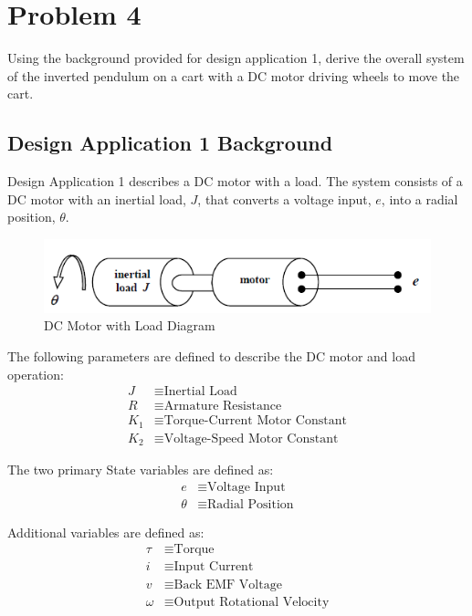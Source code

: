 \documentclass[]{article}
\begin{document}
\newpage
\section{Problem 4} \label{sec:p4}
	Using the background provided for design application 1, derive the overall system of the inverted pendulum on a cart with a DC motor driving wheels to move the cart.
	
	\subsection{Design Application 1 Background}
		Design Application 1 describes a DC motor with a load. The system consists of a DC motor with an inertial load, $J$, that converts a voltage input, $e$, into a radial position, $\theta$.
		
		\begin{figure}[h]
			\centering
			\includegraphics[width=0.7\linewidth]{Fig/DesignApplication1}
			\caption{DC Motor with Load Diagram}
			\label{fig:designapplication1}
		\end{figure}
		
		The following parameters are defined to describe the DC motor and load operation:
		\begin{align*}
			J &\equiv \text{Inertial Load}\\
			R &\equiv \text{Armature Resistance}\\
			K_1 &\equiv \text{Torque-Current Motor Constant}\\
			K_2 &\equiv \text{Voltage-Speed Motor Constant}
		\end{align*}
		
		The two primary State variables are defined as:
		\begin{align*}
			e &\equiv \text{Voltage Input}\\
			\theta &\equiv \text{Radial Position}
		\end{align*}
		
		Additional variables are defined as:
		\begin{align*}
			\tau 	&\equiv \text{Torque}\\
			i		&\equiv \text{Input Current}\\
			v 		&\equiv \text{Back EMF Voltage}\\
			\omega	&\equiv \text{Output Rotational Velocity}
		\end{align*}
		
\end{document}
